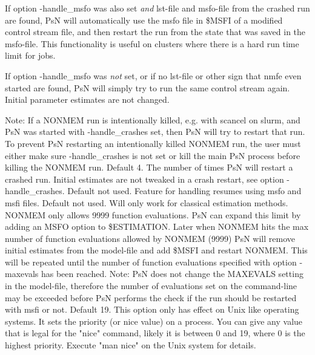 \begin{optionlist}
If option -handle\_msfo was also set \emph{and} lst-file and msfo-file from the crashed run are found, PsN will automatically use the
msfo file in \$MSFI of a modified control stream file, and then restart the run from the state that was saved in the msfo-file.
This functionality is useful on clusters where there is a hard run time limit for jobs.

If option -handle\_msfo was \emph{not} set, or if no lst-file or other sign that nmfe even started are found,
PsN will simply try to run the same control stream again. Initial parameter estimates are not changed.  

Note: If a NONMEM run is intentionally killed, e.g. with scancel on slurm, and PsN was started
with -handle\_crashes set, then PsN will try to restart that run. To prevent PsN restarting
an intentionally killed NONMEM run, the user must either make sure -handle\_crashes is not set
or kill the main PsN process before killing the NONMEM run.
\nextopt
{}
Default 4. The number of times PsN will restart a crashed run. Initial estimates are not tweaked in a crash restart, see option
-handle\_crashes.
\nextopt
{}
Default not used. Feature for handling resumes using msfo and msfi files. 
\nextopt
{}
Default not used. Will only work for classical estimation methods. NONMEM only allows 9999 function evaluations. PsN can expand this limit by adding an MSFO option to \$ESTIMATION. Later when NONMEM hits the max number of function evaluations allowed by NONMEM (9999) PsN will remove initial estimates from the model-file and add \$MSFI and restart NONMEM. This will be repeated until the number of function evaluations specified with option -maxevals has been reached. Note: PsN does not change the MAXEVALS setting in the model-file, therefore the number of evaluations set on the command-line may be exceeded before PsN performs the check if the run should be restarted with msfi or not. 
\nextopt
{}
Default 19. This option only has effect on Unix like operating systems. It  sets the priority (or nice value) on a process. You can give any value that is legal for the "nice" command, likely it is between 0 and 19, where 0 is the highest priority. Execute "man nice" on the Unix system for details. 
\nextopt
\end{optionlist}
